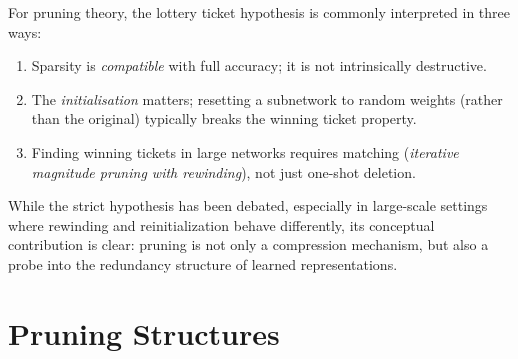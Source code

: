 \medskip
For pruning theory, the lottery ticket hypothesis is commonly interpreted in
three ways:

\begin{enumerate}
	\item Sparsity is \emph{compatible} with full accuracy; it is not
	intrinsically destructive.
	\item The \emph{initialisation} matters; resetting a subnetwork to random
	weights (rather than the original) typically breaks the winning
	ticket property.
	\item Finding winning tickets in large networks requires matching
	(\emph{iterative magnitude pruning with rewinding}), not just
	one-shot deletion.
\end{enumerate}

While the strict hypothesis has been debated, especially in large-scale
settings where rewinding and reinitialization behave differently, its
conceptual contribution is clear: pruning is not only a compression mechanism,
but also a probe into the redundancy structure of learned representations.

%
%

\section{Pruning Structures}
\label{sec:pruning_structures}

